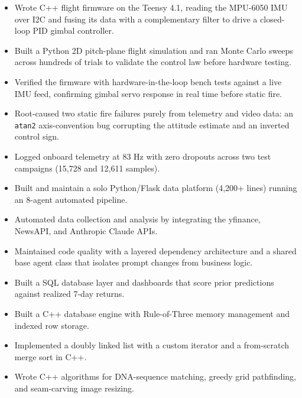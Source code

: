 \begin{itemize}
  \item Wrote C++ flight firmware on the Teensy 4.1, reading the MPU-6050 IMU over I2C and fusing its data with a complementary filter to drive a closed-loop PID gimbal controller.
  \item Built a Python 2D pitch-plane flight simulation and ran Monte Carlo sweeps across hundreds of trials to validate the control law before hardware testing.
  \item Verified the firmware with hardware-in-the-loop bench tests against a live IMU feed, confirming gimbal servo response in real time before static fire.
  \item Root-caused two static fire failures purely from telemetry and video data: an \texttt{atan2} axis-convention bug corrupting the attitude estimate and an inverted control sign.
  \item Logged onboard telemetry at 83 Hz with zero dropouts across two test campaigns (15,728 and 12,611 samples).
\end{itemize}
\entrygap

\begin{itemize}
  \item Built and maintain a solo Python/Flask data platform (4,200+ lines) running an 8-agent automated pipeline.
  \item Automated data collection and analysis by integrating the yfinance, NewsAPI, and Anthropic Claude APIs.
  \item Maintained code quality with a layered dependency architecture and a shared base agent class that isolates prompt changes from business logic.
  \item Built a SQL database layer and dashboards that score prior predictions against realized 7-day returns.
\end{itemize}
\entrygap

\begin{itemize}
  \item Built a C++ database engine with Rule-of-Three memory management and indexed row storage.
  \item Implemented a doubly linked list with a custom iterator and a from-scratch merge sort in C++.
  \item Wrote C++ algorithms for DNA-sequence matching, greedy grid pathfinding, and seam-carving image resizing.
\end{itemize}
\entrygap

